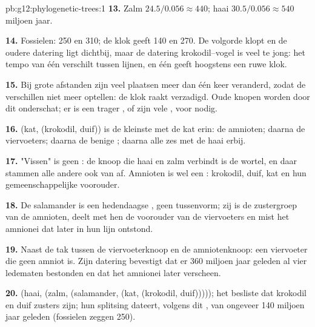 \begin{solution}{pb:g12:phylogenetic-trees:1}
\textbf{13.} Zalm $24.5/0.056 \approx 440$; haai $30.5/0.056
\approx 540$ miljoen jaar.

\textbf{14.} Fossielen: 250 en 310; de klok geeft 140 en 270. De volgorde
klopt en de oudere datering ligt dichtbij, maar de datering
krokodil--vogel is veel te jong: het tempo van één  verschilt tussen
lijnen, en één  geeft hoogstens een ruwe klok.

\textbf{15.} Bij grote afstanden zijn veel plaatsen meer dan één keer
veranderd, zodat de verschillen niet meer optellen: de klok raakt
verzadigd. Oude knopen worden door dit  onderschat; er is een trager
, of zijn vele , voor nodig.

\textbf{16.} (kat, (krokodil, duif)) is de kleinste  met de kat erin:
de amnioten; daarna de viervoeters; daarna de benige ; daarna
alle zes met de haai erbij.

\textbf{17.} "Vissen" is geen : de knoop die haai en zalm verbindt is
de wortel, en daar stammen alle andere ook van af. Amnioten is wel een
: krokodil, duif, kat en hun gemeenschappelijke voorouder.

\textbf{18.} De salamander is een hedendaagse , geen tussenvorm; zij
is de zustergroep van de amnioten, deelt met hen de voorouder van de
viervoeters en mist het amnionei dat later in hun lijn ontstond.

\textbf{19.} Naast de tak tussen de viervoeterknoop en de amniotenknoop:
een viervoeter die geen amniot is. Zijn datering bevestigt dat er 360
miljoen jaar geleden al vier ledematen bestonden en dat het amnionei later
verscheen.

\textbf{20.} (haai, (zalm, (salamander, (kat, (krokodil, duif)))));
het  besliste dat krokodil en duif zusters zijn; hun splitsing dateert,
volgens dit , van ongeveer 140 miljoen jaar geleden (fossielen zeggen
250).
\end{solution}
